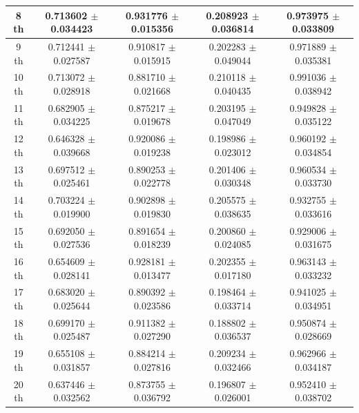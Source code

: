 \begin{table}[h!]
\begin{tabular}[6pt]{|c|c|c|c|c|}
\hline
8 th & 0.713602 $\pm$ 0.034423 & 0.931776 $\pm$ 0.015356 & 0.208923 $\pm$ 0.036814 & 0.973975 $\pm$ 0.033809\\[3pt]
\hline
9 th & 0.712441 $\pm$ 0.027587 & 0.910817 $\pm$ 0.015915 & 0.202283 $\pm$ 0.049044 & 0.971889 $\pm$ 0.035381\\[3pt]
\hline
10 th & 0.713072 $\pm$ 0.028918 & 0.881710 $\pm$ 0.021668 & 0.210118 $\pm$ 0.040435 & 0.991036 $\pm$ 0.038942\\[3pt]
\hline
11 th & 0.682905 $\pm$ 0.034225 & 0.875217 $\pm$ 0.019678 & 0.203195 $\pm$ 0.047049 & 0.949828 $\pm$ 0.035122\\[3pt]
\hline
12 th & 0.646328 $\pm$ 0.039668 & 0.920086 $\pm$ 0.019238 & 0.198986 $\pm$ 0.023012 & 0.960192 $\pm$ 0.034854\\[3pt]
\hline
13 th & 0.697512 $\pm$ 0.025461 & 0.890253 $\pm$ 0.022778 & 0.201406 $\pm$ 0.030348 & 0.960534 $\pm$ 0.033730\\[3pt]
\hline
14 th & 0.703224 $\pm$ 0.019900 & 0.902898 $\pm$ 0.019830 & 0.205575 $\pm$ 0.038635 & 0.932755 $\pm$ 0.033616\\[3pt]
\hline
15 th & 0.692050 $\pm$ 0.027536 & 0.891654 $\pm$ 0.018239 & 0.200860 $\pm$ 0.024085 & 0.929006 $\pm$ 0.031675\\[3pt]
\hline
16 th & 0.654609 $\pm$ 0.028141 & 0.928181 $\pm$ 0.013477 & 0.202355 $\pm$ 0.017180 & 0.963143 $\pm$ 0.033232\\[3pt]
\hline
17 th & 0.683020 $\pm$ 0.025644 & 0.890392 $\pm$ 0.023586 & 0.198464 $\pm$ 0.033714 & 0.941025 $\pm$ 0.034951\\[3pt]
\hline
18 th & 0.699170 $\pm$ 0.025487 & 0.911382 $\pm$ 0.027290 & 0.188802 $\pm$ 0.036537 & 0.950874 $\pm$ 0.028669\\[3pt]
\hline
19 th & 0.655108 $\pm$ 0.031857 & 0.884214 $\pm$ 0.027816 & 0.209234 $\pm$ 0.032466 & 0.962966 $\pm$ 0.034187\\[3pt]
\hline
20 th & 0.637446 $\pm$ 0.032562 & 0.873755 $\pm$ 0.036792 & 0.196807 $\pm$ 0.026001 & 0.952410 $\pm$ 0.038702\\[3pt]
\hline
\end{tabular}
\end{table}



